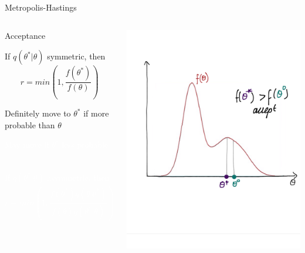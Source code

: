 \documentclass[compress]{beamer}
\begin{document}
\begin{frame}[label=sec-7-6]{Metropolis-Hastings}
    \begin{columns}[c] 
    \begin{block}{Acceptance}
        \begin{itemize}
            \item If $q(\theta^*|\theta)$ symmetric, then 
            $$ r = min \left( 1,\dfrac{f(\theta^*)}{f(\theta)} \right)$$ 
            \item Definitely move to $\theta^*$ if more probable than $\theta$ 
            \textcolor{white}{
                \item[\color{white}] May move if $\theta^*$ less probable \\~\\
                \item[\color{white}] If $q(\theta^*|\theta)$ asymmetric, then $$ r = min \left( 1,\dfrac{f(\theta^*)q(\theta|\theta^*)}{f(\theta)q(\theta^*|\theta)} \right)$$
            }
        \end{itemize}
    \end{block}

    \includegraphics[width=1\linewidth]{MH3}
\end{columns}
\end{frame}
\end{document}
